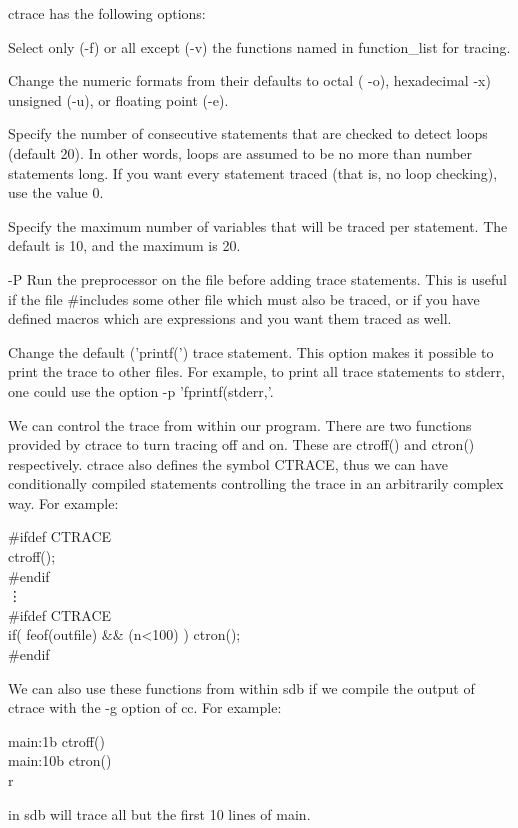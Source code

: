 {\cmd ctrace} has the following options:
\begin{hanglist}
       Select only ({\cmd -f})  or all except ({\cmd -v}) the  
functions named in {\ms function\_list\/} for  tracing. 

 Change the numeric formats from their  defaults to octal ({\cmd
-o}), hexadecimal {\cmd -x}) unsigned ({\cmd -u}), or floating point
({\cmd -e}).

  Specify  the  number  of  consecutive statements that are checked 
to detect  loops (default 20). In other words, loops are assumed to
be no more than {\ms number\/} statements long. If you want every
statement traced (that is, no loop checking), use the value 0.

  Specify the maximum number of variables that will be traced per
statement. The default is 10, and the maximum is 20.

\item[\cmd -P ]
 Run the preprocessor  on the  file before  adding  trace statements.
This  is useful  if the  file {\cd \#include}s some other file which must
also be  traced, or  if you  have defined macros which are expressions
and you want them traced as well.

   Change the default ({\cd 'printf('}) trace statement. This option
makes it possible to print the trace to other files.  For example, to  print 
all  trace statements to stderr,  one could  use the option  {\cd 
-p 'fprintf(stderr,'}.
\end{hanglist}
     We can control the trace from within our program. There are two
functions provided by  {\cmd ctrace} to turn tracing off and on.
These are {\cd ctroff()} and {\cd ctron()} respectively. {\cmd
ctrace} also defines  the symbol {\cd CTRACE}, thus  we  can  have 
conditionally compiled statements  controlling the  trace in an
arbitrarily complex way. For example:
\begin{code}
   \#ifdef CTRACE    \\
\>   ctroff();		  \\
   \#endif			  \\
	\vdots			  \\
   \#ifdef CTRACE	  \\
\>   if( feof(outfile) \&\& (n<100) ) ctron(); \\
   \#endif
\end{code}
\noindent
     We can  also use  these functions  from within {\cmd sdb} if we 
compile the output of {\cmd ctrace} with the {\cmd -g} option of
{\cmd cc}. For example:
\begin{display}\cd
          main:1b ctroff()\\
          main:10b ctron()\\
          r
\end{display}
\noindent
  in {\cmd sdb} will trace all but the first 10 lines of {\cd main}.

